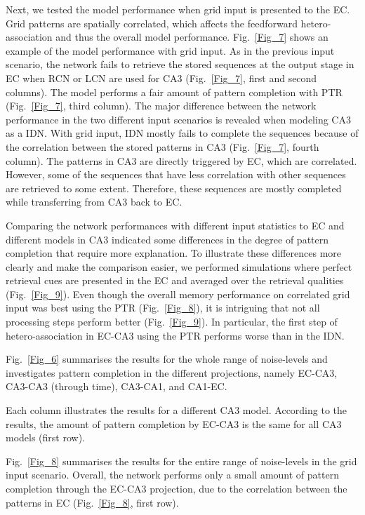 \documentclass[utf8]{frontiersSCNS} %
\begin{document}
Next, we tested the model performance when grid input is presented to the EC. Grid patterns are spatially correlated, which affects the feedforward hetero-association and thus the overall model performance. Fig.~\ref{Fig_7} shows an example of the model performance with grid input. As in the previous input scenario, the network fails to retrieve the stored sequences at the output stage in EC when RCN or LCN are used for CA3 (Fig.~\ref{Fig_7}, first and second columns). The model performs a fair amount of pattern completion with PTR (Fig.~\ref{Fig_7}, third column). The major difference between the network performance in the two different input scenarios is revealed when modeling CA3 as a IDN. With grid input, IDN mostly fails to complete the sequences because of the correlation between the stored patterns in CA3 (Fig.~\ref{Fig_7}, fourth column). The patterns in CA3 are directly triggered by EC, which are correlated. However, some of the sequences that have less correlation with other sequences are retrieved to some extent. Therefore, these sequences are mostly completed while transferring from CA3 back to EC.


Comparing the network performances with different input statistics to EC and different models in CA3 indicated some differences in the degree of pattern completion that require more explanation. To illustrate these differences more clearly and make the comparison easier, we performed simulations where perfect retrieval cues are presented in the EC and averaged over the retrieval qualities (Fig.~\ref{Fig_9}).  
%
Even though the overall memory performance on correlated grid input was best using the PTR (Fig.~\ref{Fig_8}), it is intriguing that not all processing steps perform better (Fig.~\ref{Fig_9}). In particular, the first step of hetero-association in EC-CA3 using the PTR performs worse than in the IDN.



Fig.~\ref{Fig_6} summarises the results for the whole range of noise-levels and investigates pattern completion in the different projections, namely EC-CA3, CA3-CA3 (through time), CA3-CA1, and CA1-EC. 

Each column illustrates the results for a different CA3 model. According to the results, the amount of pattern completion by EC-CA3 is the same for all CA3 models (first row). 

Fig.~\ref{Fig_8} summarises the results for the entire range of noise-levels in the grid input scenario. Overall, the network performs only a small amount of pattern completion through the EC-CA3 projection, due to the correlation between the patterns in EC (Fig.~\ref{Fig_8}, first row).
\end{document}

